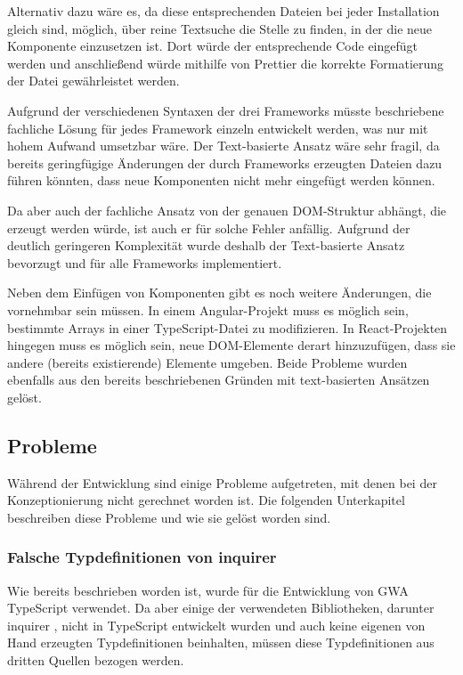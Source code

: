 Alternativ dazu wäre es, da diese entsprechenden Dateien bei jeder Installation gleich sind, möglich, über reine Textsuche die Stelle zu finden, in der die neue Komponente einzusetzen ist. Dort würde der entsprechende Code eingefügt werden und anschließend würde mithilfe von Prettier die korrekte Formatierung der Datei gewährleistet werden.

Aufgrund der verschiedenen Syntaxen der drei Frameworks müsste beschriebene fachliche Lösung für jedes Framework einzeln entwickelt werden, was nur mit hohem Aufwand umsetzbar wäre. Der Text-basierte Ansatz wäre sehr fragil, da bereits geringfügige Änderungen der durch Frameworks erzeugten Dateien dazu führen könnten, dass neue Komponenten nicht mehr eingefügt werden können.

Da aber auch der fachliche Ansatz von der genauen \gls{DOM}-Struktur abhängt, die erzeugt werden würde, ist auch er für solche Fehler anfällig. Aufgrund der deutlich geringeren Komplexität wurde deshalb der Text-basierte Ansatz bevorzugt und für alle Frameworks implementiert.

Neben dem Einfügen von Komponenten gibt es noch weitere Änderungen, die vornehmbar sein müssen. In einem Angular-Projekt muss es möglich sein, bestimmte Arrays in einer TypeScript-Datei zu modifizieren. In React-Projekten hingegen muss es möglich sein, neue \gls{DOM}-Elemente derart hinzuzufügen, dass sie andere (bereits existierende) Elemente umgeben. Beide Probleme wurden ebenfalls aus den bereits beschriebenen Gründen mit text-basierten Ansätzen gelöst.

\subsection{Probleme}
Während der Entwicklung sind einige Probleme aufgetreten, mit denen bei der Konzeptionierung nicht gerechnet worden ist. Die folgenden Unterkapitel beschreiben diese Probleme und wie sie gelöst worden sind.

\subsubsection{Falsche Typdefinitionen von inquirer}
\label{inquirer_type_issue}

Wie bereits beschrieben worden ist, wurde für die Entwicklung von \gls{GWA} TypeScript verwendet. Da aber einige der verwendeten Bibliotheken, darunter inquirer \cite{inquirer_package_json}, nicht in TypeScript entwickelt wurden und auch keine eigenen von Hand erzeugten Typdefinitionen beinhalten, müssen diese Typdefinitionen aus dritten Quellen bezogen werden.

